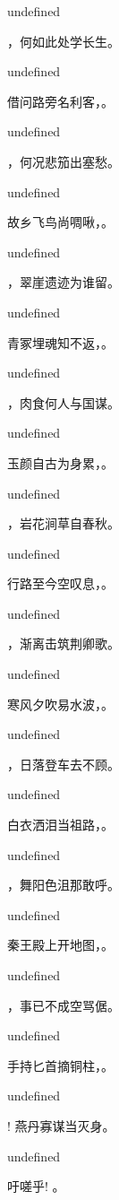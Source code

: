 \documentclass[12pt, a4paper, addpoints]{exam}
\begin{document}
\begin{questions}
undefined

\question[3] \fillin，何如此处学长生。

undefined

\question[3] 借问路旁名利客，\fillin。

undefined

\question[3] \fillin，何况悲笳出塞愁。

undefined

\question[3] 故乡飞鸟尚啁啾，\fillin。

undefined

\question[3] \fillin，翠崖遗迹为谁留。

undefined

\question[3] 青冢埋魂知不返，\fillin。

undefined

\question[3] \fillin，肉食何人与国谋。

undefined

\question[3] 玉颜自古为身累，\fillin。

undefined

\question[3] \fillin，岩花涧草自春秋。

undefined

\question[3] 行路至今空叹息，\fillin。

undefined

\question[3] \fillin，渐离击筑荆卿歌。

undefined

\question[3] 寒风夕吹易水波，\fillin。

undefined

\question[3] \fillin，日落登车去不顾。

undefined

\question[3] 白衣洒泪当祖路，\fillin。

undefined

\question[3] \fillin，舞阳色沮那敢呼。

undefined

\question[3] 秦王殿上开地图，\fillin。

undefined

\question[3] \fillin，事已不成空骂倨。

undefined

\question[3] 手持匕首摘铜柱，\fillin。

undefined

\question[3] \fillin! 燕丹寡谋当灭身。

undefined

\question[3] 吁嗟乎! \fillin。


\end{questions}
\end{document}
